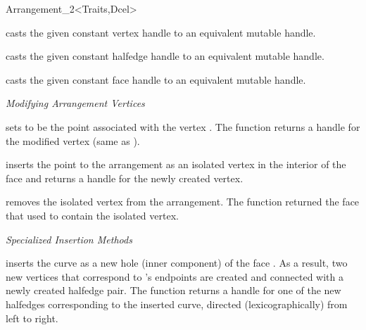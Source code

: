 \begin{ccRefClass}{Arrangement_2<Traits,Dcel>}
\begin{ccAdvanced}

 
    {casts the given constant vertex handle to an equivalent mutable handle.}

    {casts the given constant halfedge handle to an equivalent mutable handle.}

    {casts the given constant face handle to an equivalent mutable handle.}

\end{ccAdvanced}

\ccModifiers

{\sl Modifying Arrangement Vertices}

   {sets  to be the point associated with the vertex .
    The function returns a handle for the modified vertex (same as ).
    }

   {inserts the point  to the arrangement as an isolated vertex in
    the interior of the face  and returns a handle for the newly
    created vertex.}

   {removes the isolated vertex  from the arrangement. The function
    returned the face  that used to contain the isolated vertex.
    }

{\sl Specialized Insertion Methods}

   {inserts the curve  as a new hole (inner component) of the face
    . As a result, two new vertices that correspond to 's
    endpoints are created and connected with a newly created halfedge pair.
    The function returns a handle for one of the new halfedges
    corresponding to the inserted curve, directed (lexicographically)
    from left to right.
    }


\end{ccRefClass}
